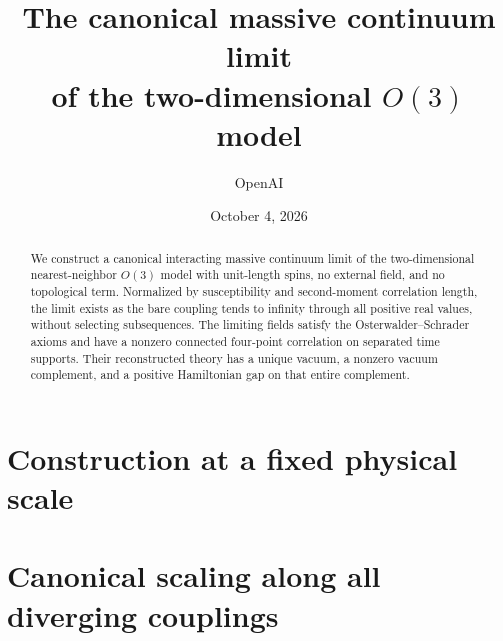 \documentclass[11pt]{article}
\title{The canonical massive continuum limit\\of the two-dimensional $O(3)$ model}
\author{OpenAI}
\date{October 4, 2026}
\numberwithin{equation}{section}
\theoremstyle{definition}
\theoremstyle{remark}
\begin{document}
\maketitle
\begin{abstract}
We construct a canonical interacting massive continuum limit of the
two-dimensional nearest-neighbor $O(3)$ model with unit-length spins,
no external field, and no topological term. Normalized by susceptibility
and second-moment correlation length, the limit exists as the bare coupling
tends to infinity through all positive real values, without selecting
subsequences. The limiting fields satisfy the Osterwalder--Schrader axioms
and have a nonzero connected four-point correlation on separated time
supports. Their reconstructed theory has a unique vacuum, a nonzero vacuum
complement, and a positive Hamiltonian gap on that entire complement.
\end{abstract}
\tableofcontents
\newpage

\part{Construction at a fixed physical scale}










\part{Canonical scaling along all diverging couplings}




\FloatBarrier


\end{document}
